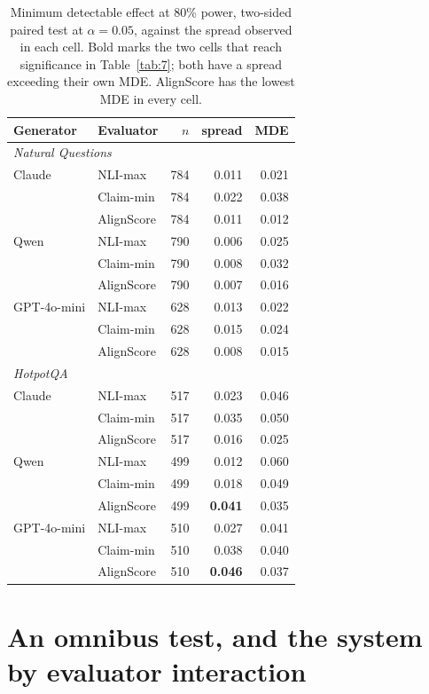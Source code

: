 \documentclass[11pt]{article}
\begin{document}
\begin{table}[t]
\centering\small
\begin{tabular}{llrrr}
\toprule
\textbf{Generator} & \textbf{Evaluator} & $n$ & spread & MDE \\
\midrule
\multicolumn{5}{l}{\emph{Natural Questions}} \\
Claude & NLI-max & 784 & 0.011 & 0.021 \\
 & Claim-min & 784 & 0.022 & 0.038 \\
 & AlignScore & 784 & 0.011 & 0.012 \\
Qwen & NLI-max & 790 & 0.006 & 0.025 \\
 & Claim-min & 790 & 0.008 & 0.032 \\
 & AlignScore & 790 & 0.007 & 0.016 \\
GPT-4o-mini & NLI-max & 628 & 0.013 & 0.022 \\
 & Claim-min & 628 & 0.015 & 0.024 \\
 & AlignScore & 628 & 0.008 & 0.015 \\
\midrule
\multicolumn{5}{l}{\emph{HotpotQA}} \\
Claude & NLI-max & 517 & 0.023 & 0.046 \\
 & Claim-min & 517 & 0.035 & 0.050 \\
 & AlignScore & 517 & 0.016 & 0.025 \\
Qwen & NLI-max & 499 & 0.012 & 0.060 \\
 & Claim-min & 499 & 0.018 & 0.049 \\
 & AlignScore & 499 & \textbf{0.041} & 0.035 \\
GPT-4o-mini & NLI-max & 510 & 0.027 & 0.041 \\
 & Claim-min & 510 & 0.038 & 0.040 \\
 & AlignScore & 510 & \textbf{0.046} & 0.037 \\
\bottomrule
\end{tabular}
\caption{Minimum detectable effect at 80\% power, two-sided paired test at $\alpha = 0.05$, against the spread observed in each cell. Bold marks the two cells that reach significance in Table~\ref{tab:7}; both have a spread exceeding their own MDE. AlignScore has the lowest MDE in every cell.}
\label{tab:power}
\end{table}


\section{An omnibus test, and the system by evaluator interaction}
\label{app:omnibus}
\end{document}
